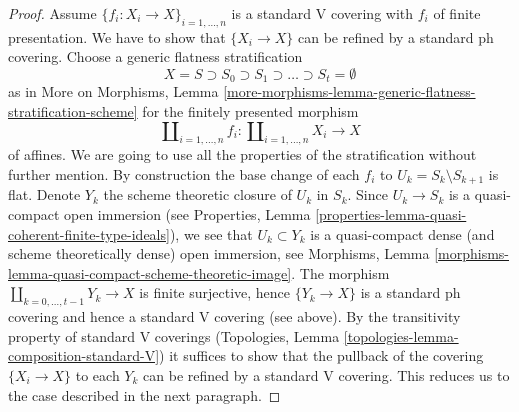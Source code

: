 \begin{proof}
\medskip\noindent
Assume $\{f_i : X_i \to X\}_{i = 1, \ldots, n}$
is a standard V covering with $f_i$ of finite presentation.
We have to show that $\{X_i \to X\}$ can be refined by a standard ph covering.
Choose a generic flatness stratification
$$
X = S \supset S_0 \supset S_1 \supset \ldots \supset S_t = \emptyset
$$
as in More on Morphisms, Lemma
\ref{more-morphisms-lemma-generic-flatness-stratification-scheme}
for the finitely presented morphism
$$
\coprod\nolimits_{i = 1, \ldots, n} f_i :
\coprod\nolimits_{i = 1, \ldots, n} X_i
\longrightarrow
X
$$
of affines. We are going to use all the properties of the stratification
without further mention. By construction the base change of each $f_i$ to
$U_k = S_k \setminus S_{k + 1}$ is flat.
Denote $Y_k$ the scheme theoretic closure of $U_k$ in $S_k$. Since
$U_k \to S_k$ is a quasi-compact open immersion (see
Properties, Lemma \ref{properties-lemma-quasi-coherent-finite-type-ideals}),
we see that $U_k \subset Y_k$ is a quasi-compact dense
(and scheme theoretically dense) open immersion, see
Morphisms, Lemma \ref{morphisms-lemma-quasi-compact-scheme-theoretic-image}.
The morphism $\coprod_{k = 0, \ldots, t - 1} Y_k \to X$
is finite surjective, hence $\{Y_k \to X\}$ is a standard ph covering
and hence a standard V covering (see above). By the transitivity
property of standard V coverings
(Topologies, Lemma \ref{topologies-lemma-composition-standard-V})
it suffices to show that the pullback of
the covering $\{X_i \to X\}$ to each $Y_k$ can be refined by a
standard V covering. This reduces us to the case described in the
next paragraph.


\end{proof}
